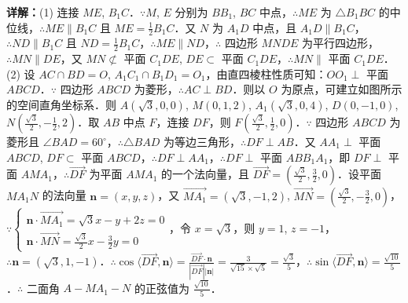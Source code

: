 \begin{question}[points=12]
\begin{solution}
\textbf{详解：}(1) 连接 $ME$, $B_1C$．$\because M$, $E$ 分别为 $BB_1$, $BC$ 中点，$\therefore ME$ 为 $\triangle B_1BC$ 的中位线，$\therefore ME \parallel B_1C$ 且 $ME = \frac{1}{2}B_1C$．又 $N$ 为 $A_1D$ 中点，且 $A_1D \parallel B_1C$，$\therefore ND \parallel B_1C$ 且 $ND = \frac{1}{2}B_1C$，$\therefore ME \parallel ND$，$\therefore$ 四边形 $MNDE$ 为平行四边形，$\therefore MN \parallel DE$，又 $MN \not\subset$ 平面 $C_1DE$, $DE \subset$ 平面 $C_1DE$，$\therefore MN \parallel$ 平面 $C_1DE$．
(2) 设 $AC \cap BD = O$, $A_1C_1 \cap B_1D_1 = O_1$，由直四棱柱性质可知：$OO_1 \perp$ 平面 $ABCD$．$\because$ 四边形 $ABCD$ 为菱形，$\therefore AC \perp BD$．则以 $O$ 为原点，可建立如图所示的空间直角坐标系．则 $A(\sqrt{3}, 0, 0)$, $M(0, 1, 2)$, $A_1(\sqrt{3}, 0, 4)$, $D(0, -1, 0)$, $N\left(\frac{\sqrt{3}}{2}, -\frac{1}{2}, 2\right)$．取 $AB$ 中点 $F$，连接 $DF$，则 $F\left(\frac{\sqrt{3}}{2}, \frac{1}{2}, 0\right)$．$\because$ 四边形 $ABCD$ 为菱形且 $\angle BAD = 60^\circ$，$\therefore \triangle BAD$ 为等边三角形，$\therefore DF \perp AB$．又 $AA_1 \perp$ 平面 $ABCD$, $DF \subset$ 平面 $ABCD$，$\therefore DF \perp AA_1$，$\therefore DF \perp$ 平面 $ABB_1A_1$，即 $DF \perp$ 平面 $AMA_1$，$\therefore \overrightarrow{DF}$ 为平面 $AMA_1$ 的一个法向量，且 $\overrightarrow{DF} = \left(\frac{\sqrt{3}}{2}, \frac{3}{2}, 0\right)$．设平面 $MA_1N$ 的法向量 $\mathbf{n} = (x, y, z)$，又 $\overrightarrow{MA_1} = (\sqrt{3}, -1, 2)$, $\overrightarrow{MN} = \left(\frac{\sqrt{3}}{2}, -\frac{3}{2}, 0\right)$，$\because \begin{cases} \mathbf{n} \cdot \overrightarrow{MA_1} = \sqrt{3}x - y + 2z = 0 \\ \mathbf{n} \cdot \overrightarrow{MN} = \frac{\sqrt{3}}{2}x - \frac{3}{2}y = 0 \end{cases}$，令 $x = \sqrt{3}$，则 $y = 1$, $z = -1$，$\therefore \mathbf{n} = (\sqrt{3}, 1, -1)$．$\therefore \cos \langle \overrightarrow{DF}, \mathbf{n} \rangle = \frac{\overrightarrow{DF} \cdot \mathbf{n}}{|\overrightarrow{DF}| |\mathbf{n}|} = \frac{3}{\sqrt{15} \times \sqrt{5}} = \frac{\sqrt{3}}{5}$，$\therefore \sin \langle \overrightarrow{DF}, \mathbf{n} \rangle = \frac{\sqrt{10}}{5}$．$\therefore$ 二面角 $A-MA_1-N$ 的正弦值为 $\frac{\sqrt{10}}{5}$．
\end{solution}
\end{question}

